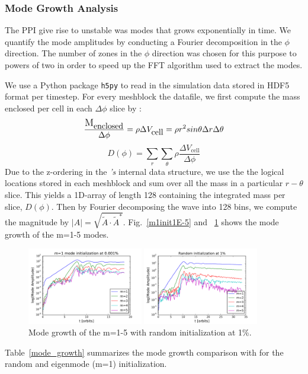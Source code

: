 \documentclass[iop,revtex4]{emulateapj}
\begin{document}
\subsubsection{Mode Growth Analysis}
The \ac{PPI} give rise to unstable was modes that grows exponentially in time. We quantify the mode amplitudes by conducting a Fourier decomposition in the $\phi$ direction. The number of zones in the $\phi$ direction was chosen for this purpose to powers of two in order to speed up the \ac{FFT} algorithm used to extract the modes. 
\par We use a Python package \texttt{h5py} to read in the simulation data stored in HDF5 format per timestep. For every meshblock the datafile, we first compute the mass enclosed per cell in each $\Delta\phi$ slice by :
\begin{equation}
\frac{\mbox{\large M}_{\mbox{enclosed}}}{\Delta\phi} = \rho\Delta V_{\mbox{cell}} = \rho r^2 sin\theta \Delta r \Delta\theta
\end{equation}
\begin{equation}
D(\phi) = \sum_r \sum_\theta \rho \frac{\Delta V_{\mbox{cell}}}{\Delta\phi}
\end{equation}
Due to the z-ordering in the \app\textit{'s} internal data structure, we use the the logical locations stored in each meshblock and sum over all the mass in a particular $r-\theta$ slice. This yields a 1D-array of length 128 containing the integrated mass per slice, $D(\phi)$. Then by Fourier decomposing the wave into 128 bins, we compute the magnitude by $|A|=\sqrt{\tilde{A}\cdot \tilde{A}^*}$. Fig.~\ref{m1init1E-5} and ~\ref{randinit1percent} shows the mode growth of the m=1-5 modes. 
\begin{figure}
\includegraphics[width=0.45\textwidth]{plots/m1init1E-5.pdf}
\caption{Mode growth of the m=1-5 initialized with m=1 mode at 0.001\%.}
\label{m1init1E-5}
\includegraphics[width=0.45\textwidth]{plots/randinit1percent.pdf}
\caption{Mode growth of the m=1-5 with random initialization at 1\%.}
\label{randinit1percent}
\end{figure}
Table~\ref{mode_growth} summarizes the mode growth comparison with \cite{Hawley:1990A} for the random and eigenmode (m=1) initialization.
\end{document}
